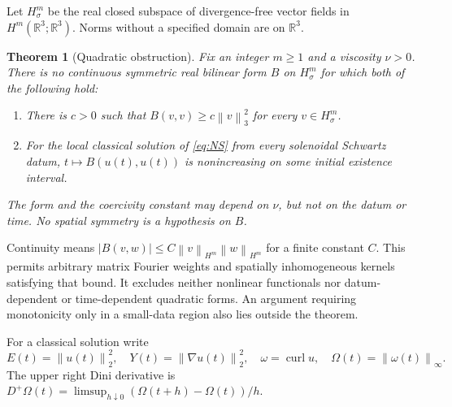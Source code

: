 \documentclass[11pt]{article}
\newtheorem{theorem}{Theorem}[section]
\theoremstyle{remark}
\newcommand{\R}{\mathbb R}
\newcommand{\curl}{\operatorname{curl}}
\newcommand{\norm}[1]{\left\lVert#1\right\rVert}
\begin{document}
Let $H^m_\sigma$ be the real closed subspace of divergence-free vector fields
in $H^m(\R^3;\R^3)$. Norms without a specified domain are on $\R^3$.

\begin{theorem}[Quadratic obstruction]\label{thm:quadratic}
Fix an integer $m\ge1$ and a viscosity $\nu>0$. There is no continuous
symmetric real bilinear form $B$ on $H^m_\sigma$ for which both of the
following hold:
\begin{enumerate}
\item There is $c>0$ such that $B(v,v)\ge c\norm v_3^2$ for every
$v\in H^m_\sigma$.
\item For the local classical solution of \eqref{eq:NS} from every
solenoidal Schwartz datum, $t\mapsto B(u(t),u(t))$ is nonincreasing on some
initial existence interval.
\end{enumerate}
The form and the coercivity constant may depend on $\nu$, but not on the
datum or time. No spatial symmetry is a hypothesis on $B$.
\end{theorem}

Continuity means $|B(v,w)|\le C\norm v_{H^m}\norm w_{H^m}$ for a finite
constant $C$. This permits arbitrary matrix Fourier weights and spatially
inhomogeneous kernels satisfying that bound. It excludes neither nonlinear
functionals nor datum-dependent or time-dependent quadratic forms. An
argument requiring monotonicity only in a small-data region also lies
outside the theorem.

For a classical solution write
\begin{equation}
 E(t)=\norm{u(t)}_2^2,\quad Y(t)=\norm{\nabla u(t)}_2^2,
 \quad \omega=\curl u,\quad \Omega(t)=\norm{\omega(t)}_\infty.
 \label{eq:observables}
\end{equation}
The upper right Dini derivative is
$D^+\Omega(t)=\limsup_{h\downarrow0}(\Omega(t+h)-\Omega(t))/h$.
\end{document}
